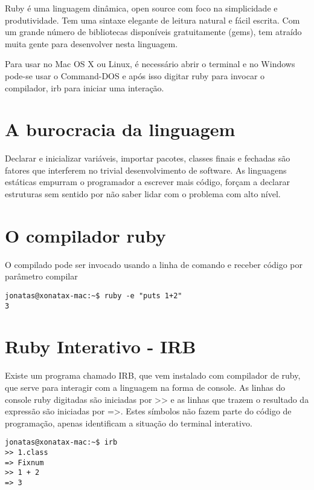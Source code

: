 \documentclass[espaco=simples,appendix=Name]{abnt}
\begin{document}
Ruby é uma linguagem dinâmica, open source com foco na simplicidade e produtividade. Tem uma sintaxe elegante de leitura natural e fácil escrita. Com um grande número de bibliotecas disponíveis gratuitamente (gems), tem atraído muita gente para desenvolver nesta linguagem.

Para usar no Mac OS X ou Linux, é necessário abrir o {terminal} e  no Windows pode-se usar o Command-DOS e após isso digitar ruby para invocar o compilador, irb para iniciar uma interação.

\section { A burocracia da linguagem }

Declarar e inicializar variáveis, importar pacotes, classes finais e fechadas são fatores que interferem no trivial desenvolvimento de software. As linguagens estáticas empurram o programador a escrever mais código, forçam a declarar estruturas sem sentido por não saber lidar com o problema com alto nível.

\section { O compilador ruby }

O compilado pode ser invocado usando a linha de comando e receber código por parâmetro compilar

\begin{lstlisting}[caption=Usando o compilador na linha de comando]
jonatas@xonatax-mac:~$ ruby -e "puts 1+2"
3
\end{lstlisting}

\section { Ruby Interativo - IRB }

Existe um programa chamado IRB, que vem instalado com compilador de ruby, que serve para interagir com a linguagem na forma de console. As linhas do console ruby digitadas são iniciadas por >> e as linhas que trazem o resultado da expressão são iniciadas por =>. Estes símbolos não fazem parte do código de programação, apenas identificam a situação do terminal interativo.

\begin{lstlisting}[caption=Usando o compilador na linha de comando]
jonatas@xonatax-mac:~$ irb
>> 1.class
=> Fixnum
>> 1 + 2
=> 3
\end{lstlisting}
\end{document}
